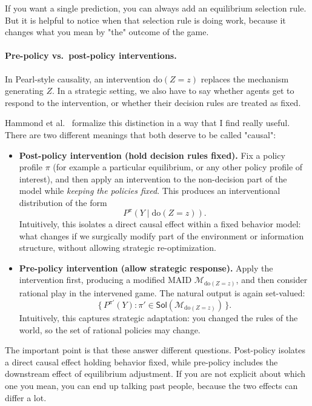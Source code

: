 \documentclass{article}
\providecommand{\do}{\mathrm{do}}
\begin{document}
If you want a single prediction, you can always add an equilibrium selection rule. But it is helpful to notice when that selection rule is doing work, because it changes what you mean by "the" outcome of the game.

\paragraph{Pre-policy vs.\ post-policy interventions.}
In Pearl-style causality, an intervention $\do(Z=z)$ replaces the mechanism generating $Z$. In a strategic setting, we also have to say whether agents get to respond to the intervention, or whether their decision rules are treated as fixed.

Hammond et al.~\cite{hammond2023causality} formalize this distinction in a way that I find really useful. There are two different meanings that both deserve to be called "causal":

\begin{itemize}
  \item \textbf{Post-policy intervention (hold decision rules fixed).} Fix a policy profile $\pi$ (for example a particular equilibrium, or any other policy profile of interest), and then apply an intervention to the non-decision part of the model while \emph{keeping the policies fixed}. This produces an interventional distribution of the form
  \[
  P^{\pi}(Y \mid \do(Z=z)).
  \]
  Intuitively, this isolates a direct causal effect within a fixed behavior model: what changes if we surgically modify part of the environment or information structure, without allowing strategic re-optimization.

  \item \textbf{Pre-policy intervention (allow strategic response).} Apply the intervention first, producing a modified MAID $\mathcal{M}_{\do(Z=z)}$, and then consider rational play in the intervened game. The natural output is again set-valued:
  \[
  \Big\{\, P^{\pi'}(Y) : \pi' \in \mathsf{Sol}(\mathcal{M}_{\do(Z=z)}) \,\Big\}.
  \]
  Intuitively, this captures strategic adaptation: you changed the rules of the world, so the set of rational policies may change.
\end{itemize}

The important point is that these answer different questions. Post-policy isolates a direct causal effect holding behavior fixed, while pre-policy includes the downstream effect of equilibrium adjustment. If you are not explicit about which one you mean, you can end up talking past people, because the two effects can differ a lot.
\end{document}
